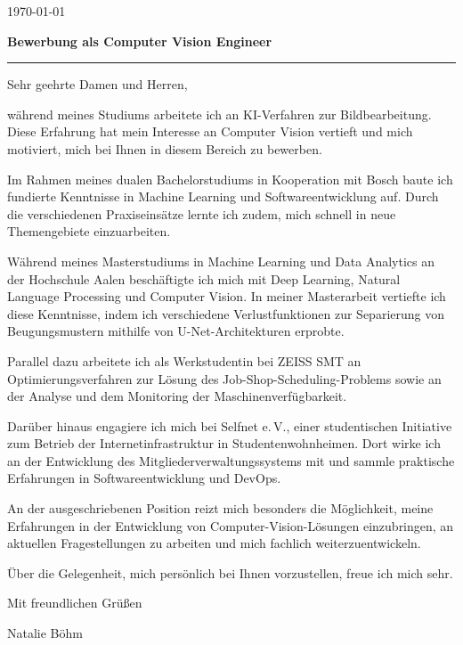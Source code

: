 \documentclass[11pt,a4paper]{article}
\newcommand{\Briefdatum}{\today}
\begin{document}
\color{CVText}

{\raggedleft \Briefdatum\par}
\vspace{5mm}
{\large\bfseries\textcolor{CVPrimary}{Bewerbung als Computer Vision Engineer}}\par
{\color{CVPrimary}\rule{\linewidth}{0.6pt}}\par
\vspace{1mm}

Sehr geehrte Damen und Herren,

während meines Studiums arbeitete ich an KI-Verfahren zur Bildbearbeitung.
Diese Erfahrung hat mein Interesse an Computer Vision vertieft und mich
motiviert, mich bei Ihnen in diesem Bereich zu bewerben.

Im Rahmen meines dualen Bachelorstudiums in Kooperation mit Bosch baute
ich fundierte Kenntnisse in Machine Learning und Softwareentwicklung auf.
Durch die verschiedenen Praxiseinsätze lernte ich zudem, mich schnell in
neue Themengebiete einzuarbeiten.

Während meines Masterstudiums in Machine Learning und Data Analytics an
der Hochschule Aalen beschäftigte ich mich mit Deep Learning, Natural
Language Processing und Computer Vision. In meiner Masterarbeit vertiefte
ich diese Kenntnisse, indem ich verschiedene Verlustfunktionen zur
Separierung von Beugungsmustern mithilfe von U-Net-Architekturen erprobte.

Parallel dazu arbeitete ich als Werkstudentin bei ZEISS SMT an
Optimierungsverfahren zur Lösung des Job-Shop-Scheduling-Problems sowie
an der Analyse und dem Monitoring der Maschinenverfügbarkeit.

Darüber hinaus engagiere ich mich bei Selfnet e.\,V., einer studentischen
Initiative zum Betrieb der Internetinfrastruktur in Studentenwohnheimen.
Dort wirke ich an der Entwicklung des Mitgliederverwaltungssystems mit
und sammle praktische Erfahrungen in Softwareentwicklung und DevOps.

An der ausgeschriebenen Position reizt mich besonders die Möglichkeit,
meine Erfahrungen in der Entwicklung von Computer-Vision-Lösungen
einzubringen, an aktuellen Fragestellungen zu arbeiten und mich fachlich
weiterzuentwickeln.

Über die Gelegenheit, mich persönlich bei Ihnen vorzustellen, freue ich
mich sehr.

Mit freundlichen Grüßen

\vspace{6mm}
Natalie Böhm
\end{document}
